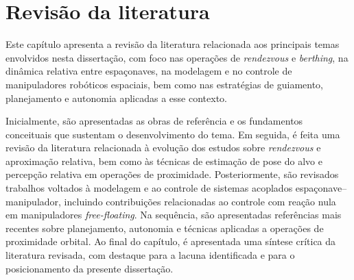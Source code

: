 \chapter{Revisão da literatura}
\label{sec_Revisao_literatura}

Este capítulo apresenta a revisão da literatura relacionada aos principais temas envolvidos nesta dissertação, com foco nas operações de \textit{rendezvous} e \textit{berthing}, na dinâmica relativa entre espaçonaves, na modelagem e no controle de manipuladores robóticos espaciais, bem como nas estratégias de guiamento, planejamento e autonomia aplicadas a esse contexto.

Inicialmente, são apresentadas as obras de referência e os fundamentos conceituais que sustentam o desenvolvimento do tema. Em seguida, é feita uma revisão da literatura relacionada à evolução dos estudos sobre \textit{rendezvous} e aproximação relativa, bem como às técnicas de estimação de pose do alvo e percepção relativa em operações de proximidade. Posteriormente, são revisados trabalhos voltados à modelagem e ao controle de sistemas acoplados espaçonave--manipulador, incluindo contribuições relacionadas ao controle com reação nula em manipuladores \textit{free-floating}. Na sequência, são apresentadas referências mais recentes sobre planejamento, autonomia e técnicas aplicadas a operações de proximidade orbital. Ao final do capítulo, é apresentada uma síntese crítica da literatura revisada, com destaque para a lacuna identificada e para o posicionamento da presente dissertação.















